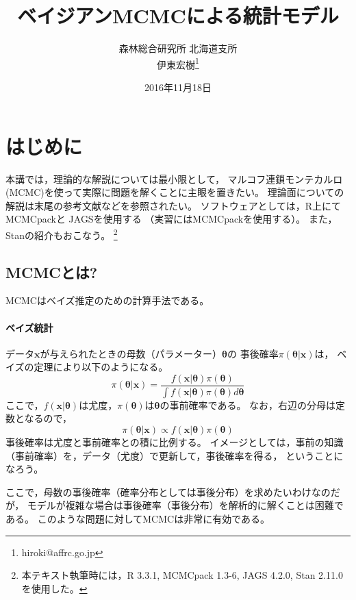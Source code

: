 \documentclass[11pt,uplatex]{jsarticle}
\begin{document}
\title{ベイジアンMCMCによる統計モデル}
\author{森林総合研究所 北海道支所\\伊東宏樹\footnote{hiroki@affrc.go.jp}}
\date{2016年11月18日}
\maketitle


\section{はじめに}

本講では，理論的な解説については最小限として，
マルコフ連鎖モンテカルロ(MCMC)を使って実際に問題を解くことに主眼を置きたい。
理論面についての解説は末尾の参考文献などを参照されたい。
ソフトウェアとしては，\textsf{R}\cite{R}上にて
\textsf{MCMCpack}\cite{MCMCpack}と
\textsf{JAGS}\cite{JAGS}を使用する
（実習には\textsf{MCMCpack}を使用する）。
また，\textsf{Stan}\cite{Stan}の紹介もおこなう。
\footnote{本テキスト執筆時には，R 3.3.1, MCMCpack 1.3-6, JAGS 4.2.0, Stan 2.11.0を使用した。}

\subsection{MCMCとは?}

MCMCはベイズ推定のための計算手法である。

\paragraph{ベイズ統計}

データ$\bm{x}$が与えられたときの母数（パラメーター）$\bm{\theta}$の
事後確率$\pi(\bm{\theta}|\bm{x})$は，
ベイズの定理により以下のようになる。
\begin{equation}
\pi(\bm{\theta}|\bm{x}) = \frac{f(\bm{x}|\bm{\theta})\pi(\bm{\theta})}
{\int{f(\bm{x}|\bm{\theta})\pi(\bm{\theta})d\bm{\theta}}}\label{bayes1}
\end{equation}
ここで，$f(\bm{x}|\bm{\theta})$は尤度，$\pi(\bm{\theta})$は$\bm{\theta}$の事前確率である。
なお，右辺の分母は定数となるので，
\begin{equation}
\pi(\bm{\theta}|\bm{x}) \propto f(\bm{x}|\bm{\theta})\pi(\bm{\theta})\label{bayes2}
\end{equation}
事後確率は尤度と事前確率との積に比例する。
イメージとしては，事前の知識（事前確率）を，データ（尤度）で更新して，事後確率を得る，
ということになろう。

ここで，母数の事後確率（確率分布としては事後分布）を求めたいわけなのだが，
モデルが複雑な場合は事後確率（事後分布）を解析的に解くことは困難である。
このような問題に対してMCMCは非常に有効である。
\end{document}

